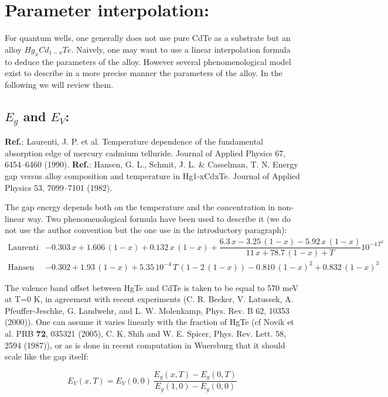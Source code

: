 \documentclass[prb,aps]{revtex4}
\begin{document}
\section{Parameter interpolation:}

    For quantum wells, one generally does not use pure CdTe as a substrate but an alloy $Hg_xCd_{1-x}Te$. Naively, one may want to use a linear interpolation formula to deduce the parameters of the alloy. However several phenomenological model exist to describe in a more precise manner the parameters of the alloy. In the following we will review them.

    \subsection{$E_g$ and $E_V$:}

        {\bf Ref.}:  Laurenti, J. P. et al. Temperature dependence of the fundamental absorption edge of mercury cadmium telluride. Journal of Applied Physics 67, 6454–6460 (1990).
        {\bf Ref.}:  Hansen, G. L., Schmit, J. L. \& Casselman, T. N. Energy gap versus alloy composition and temperature in Hg1-xCdxTe. Journal of Applied Physics 53, 7099–7101 (1982).


        The gap energy depends both on the temperature and the concentration in non-linear way. Two phenomenological formula have been used to describe it (we do not use the author convention but the one use in the introductory paragraph):
        \begin{align}
            \text{Laurenti}& -0.303\,x + 1.606\,(1-x) + 0.132\,x\,(1-x) + \dfrac{6.3\,x - 3.25\,(1-x) - 5.92\,x\,(1-x)}{11\,x + 78.7\,(1-x) + T}10^{-4\,T^2}\\
            \text{Hansen}& -0.302 + 1.93\,(1-x) + 5.35\,10^{-4}\,T\,(1-2\,(1-x)) -0.810\,(1-x)^2 + 0.832\,(1-x)^3
        \end{align}

        The valence band offset between HgTe and CdTe is taken to be equal to 570 meV at T=0 K, in  agreement  with  recent  experiments (C. R. Becker, V. Latussek, A. Pfeuffer-Jeschke, G. Landwehr, and L. W. Molenkamp, Phys. Rev. B 62, 10353 (2000)). One can assume it varies linearly with the fraction of HgTe (cf Novik et al. PRB {\bf 72}, 035321 (2005), C. K. Shih and W. E. Spicer, Phys. Rev. Lett. 58, 2594 (1987)), or as is done in recent computation in Wuersburg that it should scale like the gap itself:

        \begin{equation}
            E_V(x, T) = E_V(0, 0)\,\frac{E_g(x, T) - E_g(0, T)}{E_g(1, 0) - E_g(0, 0)}
        \end{equation}
\end{document}
